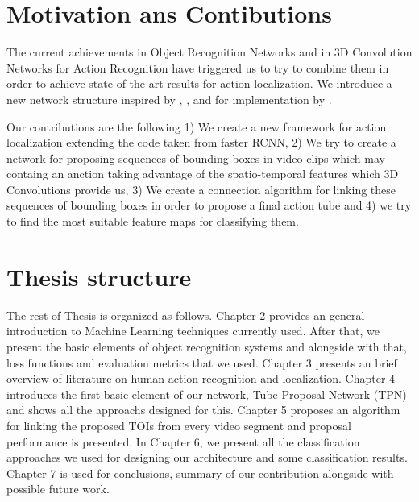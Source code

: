 \documentclass{report}
\begin{document}
\section{Motivation ans Contibutions}
The current achievements in Object Recognition Networks and in 3D Convolution Networks for Action Recognition have triggered us to try
to combine them in order to achieve state-of-the-art results for action localization. We introduce a new network structure inspired by
\cite{DBLP:journals/corr/HouCS17}, \cite{DBLP:journals/corr/abs-1712-09184},\cite{Ren:2015:FRT:2969239.2969250} and for implementation
by \cite{jjfaster2rcnn}.

Our contributions are the following 1) We create a new framework for action localization extending the code taken from faster RCNN,
2) We try to create a network for proposing sequences of bounding boxes in video clips which may containg an anction taking advantage
of the spatio-temporal features which 3D Convolutions provide us, 3) We create a connection algorithm for linking these sequences of
bounding boxes in order to propose a final action tube and 4) we try to find the most suitable feature maps for classifying them.

\section{Thesis structure}
The rest of Thesis is organized as follows. Chapter 2 provides an general introduction to Machine Learning techniques currently used.
After that, we present the basic elements of object recognition systems and alongside with that, loss functions and evaluation metrics that
we used. Chapter 3 presents an brief overview of literature on human action recognition and localization. Chapter 4 introduces the first basic
element of our network, Tube Proposal Network (TPN) and shows all the approachs designed for this. Chapter 5 proposes an algorithm
for linking the proposed TOIs from every video segment and proposal performance is presented. In Chapter 6, we present all the classification
approaches we used for designing our architecture and some classification results.  Chapter 7 is used for conclusions, summary of our contribution
alongside with possible future work.
\end{document}

